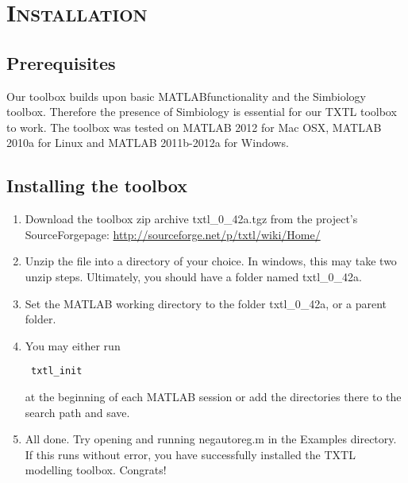 \chapter{\textsc{Installation}}
	\section{Prerequisites}
	Our toolbox builds upon basic MATLAB\texttrademark  functionality and the Simbiology toolbox. Therefore the presence of Simbiology is essential for our TXTL toolbox to work. The toolbox was tested on MATLAB 2012 for Mac OSX, MATLAB 2010a for Linux and MATLAB 2011b-2012a for Windows. 
	\section{Installing the toolbox}
	\begin{enumerate}
\item Download the toolbox zip archive \textsf{txtl\_0\_42a.tgz} from the project's SourceForge\texttrademark page: \url{http://sourceforge.net/p/txtl/wiki/Home/}
\item Unzip the file into a directory of your choice. In windows, this may take two unzip steps. Ultimately, you should have a folder named txtl\_0\_42a. 
\item Set the MATLAB working directory to the folder txtl\_0\_42a, or a parent folder. 
\item You may either run \begin{verbatim} txtl_init  \end{verbatim} at the
beginning of each MATLAB session or add the directories there to the search path and save. 
\item All done. Try opening and running \textsf{negautoreg.m} in the \textsf{Examples} directory. If this runs without error, you have successfully installed the TXTL modelling toolbox. Congrats!
\end{enumerate}